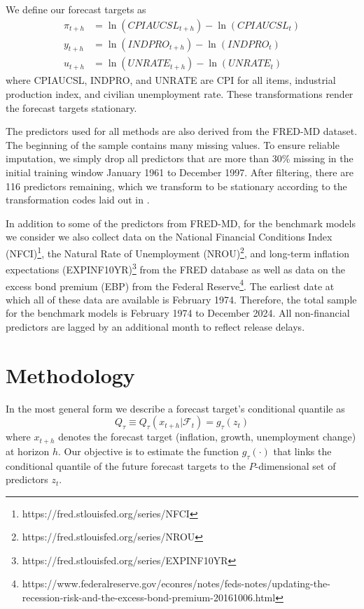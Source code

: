 \documentclass[12pt]{article}
\begin{document}
We define our forecast targets as 
\begin{align}\label{eq: forecast targets}
  \pi_{t+h} &= \ln(CPIAUCSL_{t+h}) - \ln(CPIAUCSL_{t}) \\
  y_{t+h} &= \ln(INDPRO_{t+h}) - \ln(INDPRO_{t}) \\ 
  u_{t+h} &= \ln(UNRATE_{t+h}) - \ln(UNRATE_{t})
\end{align}
where CPIAUCSL, INDPRO, and UNRATE are CPI for all items, industrial production index, and civilian unemployment rate. These transformations render the forecast targets stationary. 

The predictors used for all methods are also derived from the FRED-MD dataset. The beginning of the sample contains many missing values. To ensure reliable imputation, we simply drop all predictors that are more than 30\% missing in the initial training window January 1961 to December 1997. After filtering, there are 116 predictors remaining, which we transform to be stationary according to the transformation codes laid out in \cite{mccrackenFREDMDMonthlyDatabase2016}. 

In addition to some of the predictors from FRED-MD, for the benchmark models we consider we also collect data on the National Financial Conditions Index (NFCI)\footnote{https://fred.stlouisfed.org/series/NFCI}, the Natural Rate of Unemployment (NROU)\footnote{https://fred.stlouisfed.org/series/NROU}, and long-term inflation expectations (EXPINF10YR)\footnote{https://fred.stlouisfed.org/series/EXPINF10YR} from the FRED database as well as data on the excess bond premium (EBP) from the Federal Reserve\footnote{https://www.federalreserve.gov/econres/notes/feds-notes/updating-the-recession-risk-and-the-excess-bond-premium-20161006.html}. The earliest date at which all of these data are available is February 1974. Therefore, the total sample for the benchmark models is February 1974 to December 2024. All non-financial predictors are lagged by an additional month to reflect release delays.

\section{Methodology}\label{sec: methodology}

In the most general form we describe a forecast target's conditional quantile as 
\begin{equation}
	Q_\tau \equiv Q_{\tau}(x_{t+h} | \mathcal F_t) = g_\tau(z_t)
\end{equation}
where $x_{t+h}$ denotes the forecast target (inflation, growth, unemployment change) at horizon $h$. Our objective is to estimate the function $g_\tau(\cdot)$ that links the conditional quantile of the future forecast targets to the $P$-dimensional set of predictors $z_t$. 
\end{document}
